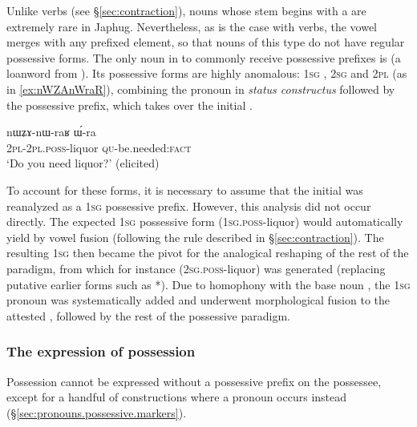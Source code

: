 Unlike verbs (see §\ref{sec:contraction}), nouns whose stem begins with a  are extremely rare in Japhug. Nevertheless, as is the case with verbs, the vowel  merges with any prefixed element, so that nouns of this type do not have regular possessive forms. The only noun in  to commonly receive possessive prefixes is  (a loanword from ). Its possessive forms are highly anomalous: \textsc{1sg} , \textsc{2sg}  and \textsc{2pl}  (as in \ref{ex:nWZAnWraR}), combining the pronoun in \textit{status constructus} followed by the possessive prefix, which takes over the initial .

\begin{exe}
\ex \label{ex:nWZAnWraR}
\gll nɯʑɤ-nɯ-raʁ ɯ́-ra \\
\textsc{2pl}-\textsc{2pl}.\textsc{poss}-liquor \textsc{qu}-be.needed:\textsc{fact} \\
\glt `Do you need liquor?' (elicited)
\end{exe}

To account for these forms, it is necessary to assume that the initial  was reanalyzed as a \textsc{1sg} possessive prefix. However, this analysis did not occur directly. The expected \textsc{1sg} possessive form  (\textsc{1sg}.\textsc{poss}-liquor) would automatically yield  by vowel fusion (following the rule described in §\ref{sec:contraction}). The resulting \textsc{1sg}  then became the pivot for the analogical reshaping of the rest of the paradigm, from which for instance   (\textsc{2sg}.\textsc{poss}-liquor) was generated (replacing putative earlier forms such as  *). Due to homophony with the base noun , the \textsc{1sg} pronoun  was systematically added and  underwent morphological fusion to the attested , followed by the rest of the possessive paradigm.
 

\subsubsection{The expression of possession} \label{ex:prefix.expression.of.possession}
Possession cannot be expressed without a possessive prefix on the possessee, except for a handful of constructions where a pronoun occurs instead (§\ref{sec:pronouns.possessive.markers}).

